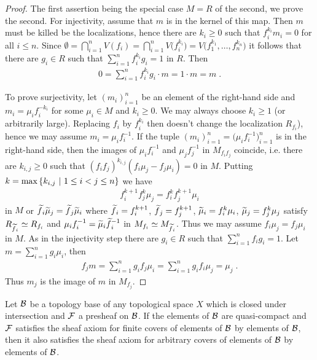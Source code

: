 \documentclass[a4paper,parskip=half,numbers=enddot, DIV=12]{scrreprt}
\begin{document}
\begin{proof}
    The first assertion being the special case $M=R$ of the second, we prove the second. For injectivity, assume that $m$ is in the kernel of this map. Then $m$ must be killed be the localizations, hence there are $k_i\geq0$ such that $f^{k_i}_i m_i = 0$ for all $i\leq n$. Since $\emptyset = \bigcap_{i=1}^n V(f_i) = \bigcap_{i=1}^n V\big(f^{k_i}_i\big) = V\big(f_1^{k_1},\ldots, f_n^{k_n}\big)$ it follows that there are $g_i\in R$ such that $\sum_{i=1}^n f_i^{k_i}g_i = 1$ in $R$. Then 
    \begin{align*}
    	0=\sum_{i=1}^{n}f_i^{k_i}g_i\cdot m=1\cdot m=m\;.
    \end{align*}
    
	    To prove surjectivity, let $(m_i)_{i=1}^n$ be an element of the right-hand side and $m_i=\mu_if_i^{-k_i}$ for some $\mu_i\in M$ and $k_i\geq0$. We may always choose $k_i\geq1$ (or arbitrarily large). Replacing $f_i$ by $f_i^{k_i}$ then doesn't change the localization $R_{f_i}$), hence we may assume $m_i = \mu_if_i^{-1}$. If the tuple $(m_i)_{i=1}^n=\big(\mu_if_i^{-1}\big)_{i=1}^n$ is in the right-hand side, then the images of $\mu_if_i^{-1}$ and $\mu_jf_j^{-1}$ in $M_{f_if_j}$ coincide, i.e. there are $k_{i,j}\geq 0$ such that $(f_if_j)^{k_{i,j}}(f_i\mu_j - f_j\mu_i) = 0$ in $M$. Putting $k= \max\left\{ k_{i,j}\ \middle|\  1\leq i <j\leq n\right\}$ we have 
    \begin{align*}
        f_i^{k+1}f_j^k\mu_j = f_i^k f_j^{k+1}\mu_i
    \end{align*}
    in $M$ or $\snake f_i\snake \mu_j = \snake f_j \snake \mu_i$ where $\snake f_i = f_i^{k+1}$, $\snake f_j = f_j^{k+1}$, $\snake \mu_i = f_i^k\mu_i$, $\snake \mu_j = f_j^k\mu_j$ satisfy $R_{\snake f_i} \simeq R_{f_i}$ and $\mu_if_i^{-1} = \smash{\snake \mu_i\snake f_i^{-1}}$ in $M_{f_i} \simeq M_{\snake f_i}$. Thus we may assume $f_i\mu_j = f_j\mu_i$ in $M$. As in the injectivity step there are $g_i\in R$ such that $\sum_{i=1}^n f_i g_i = 1$. Let $m = \sum_{i=1}^n g_i\mu_i$, then 
    \begin{align*}
    	f_jm = \sum_{i=1}^n g_if_j\mu_i = \sum_{i=1}^n g_i f_i\mu_j = \mu_j\;. 
    \end{align*}
    Thus $m_j$ is the image of $m$ in $M_{f_j}$.
\end{proof}
\begin{lem}
    Let $\mathcal{B}$ be a topology base of any topological space $X$ which is closed under intersection and $\mathcal{F}$ a presheaf on $\mathcal{B}$. If the elements of $\mathcal{B}$ are quasi-compact and $\mathcal{F}$ satisfies the sheaf axiom for finite covers of elements of $\mathcal{B}$ by elements of $\mathcal{B}$, then it also satisfies the sheaf axiom for arbitrary covers of elements of $\mathcal{B}$ by elements of $\mathcal{B}$.
\end{lem}
\end{document}
